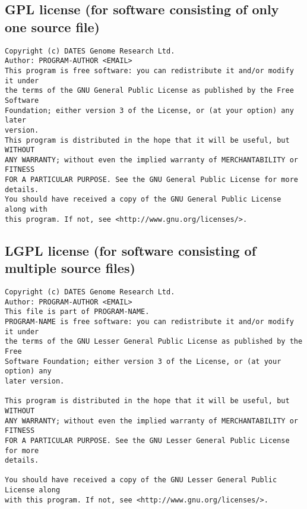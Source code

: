 \documentclass[10pt,a4paper]{article}
\begin{document}
\subsection{GPL license (for software consisting of only one source file)}
\begin{boilerplate}
\begin{verbatim}
Copyright (c) DATES Genome Research Ltd. 
Author: PROGRAM-AUTHOR <EMAIL> 
This program is free software: you can redistribute it and/or modify it under 
the terms of the GNU General Public License as published by the Free Software 
Foundation; either version 3 of the License, or (at your option) any later 
version. 
This program is distributed in the hope that it will be useful, but WITHOUT 
ANY WARRANTY; without even the implied warranty of MERCHANTABILITY or FITNESS 
FOR A PARTICULAR PURPOSE. See the GNU General Public License for more 
details. 
You should have received a copy of the GNU General Public License along with 
this program. If not, see <http://www.gnu.org/licenses/>. 
\end{verbatim}
\end{boilerplate}

\subsection{LGPL license (for software consisting of multiple source files)}
\begin{boilerplate}
\begin{verbatim}
Copyright (c) DATES Genome Research Ltd. 
Author: PROGRAM-AUTHOR <EMAIL> 
This file is part of PROGRAM-NAME. 
PROGRAM-NAME is free software: you can redistribute it and/or modify it under 
the terms of the GNU Lesser General Public License as published by the Free 
Software Foundation; either version 3 of the License, or (at your option) any 
later version. 
 
This program is distributed in the hope that it will be useful, but WITHOUT 
ANY WARRANTY; without even the implied warranty of MERCHANTABILITY or FITNESS 
FOR A PARTICULAR PURPOSE. See the GNU Lesser General Public License for more 
details. 
 
You should have received a copy of the GNU Lesser General Public License along 
with this program. If not, see <http://www.gnu.org/licenses/>. 
\end{verbatim}
\end{boilerplate}
\end{document}
